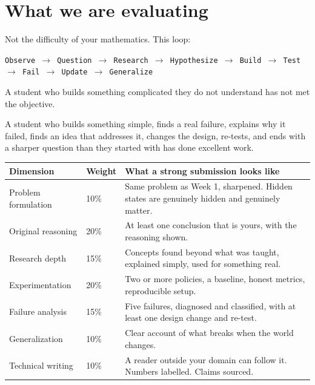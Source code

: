 \documentclass[11pt,a4paper]{article}
\begin{document}
\section{What we are evaluating}

Not the difficulty of your mathematics. This loop:

\begin{center}
\texttt{Observe $\rightarrow$ Question $\rightarrow$ Research $\rightarrow$ Hypothesize $\rightarrow$ Build $\rightarrow$ Test $\rightarrow$ Fail $\rightarrow$ Update $\rightarrow$ Generalize}
\end{center}

A student who builds something complicated they do not understand has not met the objective.

A student who builds something simple, finds a real failure, explains why it failed, finds an
idea that addresses it, changes the design, re-tests, and ends with a sharper question than they
started with has done excellent work.

\begin{center}
\begin{tabular}{@{}L{4.6cm}C{1.6cm}L{8.2cm}@{}}
\toprule
\textbf{Dimension} & \textbf{Weight} & \textbf{What a strong submission looks like} \\
\midrule
Problem formulation & 10\% & Same problem as Week 1, sharpened. Hidden states are genuinely hidden and genuinely matter. \\
Original reasoning & 20\% & At least one conclusion that is yours, with the reasoning shown. \\
Research depth & 15\% & Concepts found beyond what was taught, explained simply, used for something real. \\
Experimentation & 20\% & Two or more policies, a baseline, honest metrics, reproducible setup. \\
Failure analysis & 15\% & Five failures, diagnosed and classified, with at least one design change and re-test. \\
Generalization & 10\% & Clear account of what breaks when the world changes. \\
Technical writing & 10\% & A reader outside your domain can follow it. Numbers labelled. Claims sourced. \\
\bottomrule
\end{tabular}
\end{center}
\end{document}
